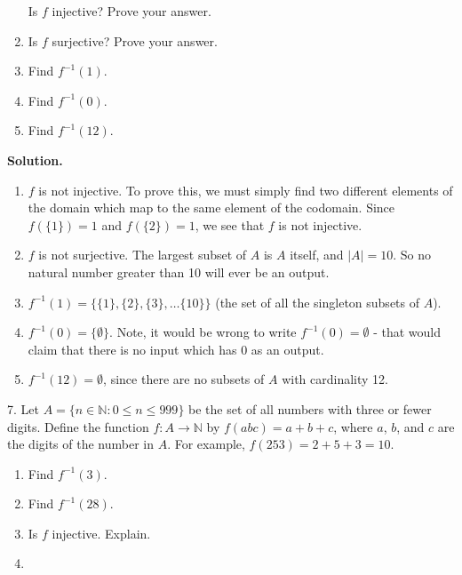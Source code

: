 \documentclass[10pt,]{book}
\theoremstyle{plain}
\theoremstyle{definition}
\theoremstyle{definition}
\theoremstyle{definition}
\numberwithin{equation}{section}
\def\N{\mathbb N}
\def\inv{^{-1}}
\def\st{:}
\begin{document}
\begin{exerciselist}
\begin{enumerate}[label=(\alph*)]
Is \(f\) injective?  Prove your answer.
%
\item\hypertarget{li-316}{}
Is \(f\) surjective?  Prove your answer.
%
\item\hypertarget{li-317}{}
Find \(f\inv(1)\).
%
\item\hypertarget{li-318}{}
Find \(f\inv(0)\).
%
\item\hypertarget{li-319}{}
Find \(f\inv(12)\).
%
\end{enumerate}
\par\smallskip
\par\smallskip
\noindent\textbf{Solution.}\hypertarget{solution-50}{}\quad
\leavevmode%
\begin{enumerate}[label=(\alph*)]
\item\hypertarget{li-320}{}\(f\) is not injective.  To prove this, we must simply find two different elements of the domain which map to the same element of the codomain.  Since \(f(\{1\}) = 1\) and \(f(\{2\}) = 1\), we see that \(f\) is not injective.\item\hypertarget{li-321}{}\(f\) is not surjective.  The largest subset of \(A\) is \(A\) itself, and \(|A| = 10\).  So no natural number greater than 10 will ever be an output.\item\hypertarget{li-322}{}\(f\inv(1) = \{\{1\}, \{2\}, \{3\}, \ldots \{10\}\}\) (the set of all the singleton subsets of \(A\)).\item\hypertarget{li-323}{}\(f\inv(0) = \{\emptyset\}\).  Note, it would be wrong to write \(f\inv(0) = \emptyset\) - that would claim that there is no input which has 0 as an output.\item\hypertarget{li-324}{}\(f\inv(12) = \emptyset\), since there are no subsets of \(A\) with cardinality 12.\end{enumerate}
\item[7.]\hypertarget{exercise-33}{}
Let \(A = \{n \in \N \st 0 \le n \le 999\}\) be the set of all numbers with three or fewer digits. Define the function \(f:A \to \N\) by \(f(abc) = a+b+c\), where \(a\), \(b\), and \(c\) are the digits of the number in \(A\). For example, \(f(253) = 2 + 5 + 3 =  10\).
%
\leavevmode%
\begin{enumerate}[label=(\alph*)]
\item\hypertarget{li-325}{}
Find \(f\inv(3)\).
%
\item\hypertarget{li-326}{}
Find \(f\inv(28)\).
%
\item\hypertarget{li-327}{}
Is \(f\) injective.  Explain.
%
\item\hypertarget{li-328}{}

\end{enumerate}
\end{exerciselist}
\end{document}
